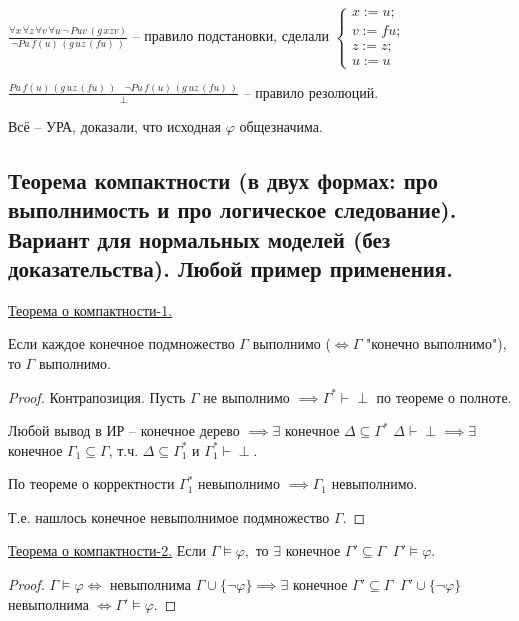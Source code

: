 \documentclass[a4paper, fleqn]{article}
\begin{document}
    $ \frac{\forall x \, \forall z  \, \forall v \, \forall u \, \neg \, Puv \, (g \, xzv)}{\neg Pu \, f(u) \,(g \, uz \, (fu) \, )} $ -- правило подстановки, сделали $\begin{cases}
    x := u; \\
    v := fu; \\
    z := z; \\
    u := u
    \end{cases}$
    
    $\frac{P u \, f(u)\, (g \, uz \, (fu)\,)  \; \; \; \neg Pu \, f(u) \,(g \, uz \, (fu) \, ) }{\perp}$  -- правило резолюций.
    
    Всё -- УРА, доказали, что исходная  $\varphi$ общезначима.
    

    
    \subsection*{Теорема компактности (в двух формах: про выполнимость и про логическое следование). Вариант для нормальных моделей (без доказательства). Любой пример применения.}

    \underline{Теорема о компактности-1.}
    
    Если каждое конечное подмножество $\Gamma$ выполнимо ($\iff \Gamma$ "конечно выполнимо"), то $\Gamma$ выполнимо.

    \begin{proof} Контрапозиция. Пусть $\Gamma$ не выполнимо $\implies \Gamma^* \vdash \perp$  по теореме о полноте.
    
    Любой вывод в ИР -- конечное дерево $\implies \exists $ конечное $\Delta \subseteq \Gamma^*$ $\Delta \vdash \perp \implies \exists$ конечное $\Gamma_1 \subseteq \Gamma$, т.ч. $\Delta \subseteq \Gamma^*_1$ и $\Gamma^*_1 \vdash \perp.$
    
    По теореме о корректности $\Gamma^*_1$ невыполнимо $\implies \Gamma_1$ невыполнимо.
    
    Т.е. нашлось конечное невыполнимое подмножество $\Gamma.$
    
    \end{proof}
    
    \underline{Теорема о компактности-2.} Если $\Gamma \vDash \varphi,$ то $\exists$ конечное $\Gamma' \subseteq \Gamma \; \; \Gamma' \vDash \varphi.$
    
    \begin{proof} 

    $\Gamma \vDash \varphi \iff $ невыполнима  $\Gamma \cup \{ \neg \varphi\} \implies \exists$  конечное $\Gamma' \subseteq \Gamma \; \; \Gamma' \cup \{\neg \varphi \}$  невыполнима $\iff \Gamma' \vDash \varphi.$
    
    \end{proof}
    
\end{document}
